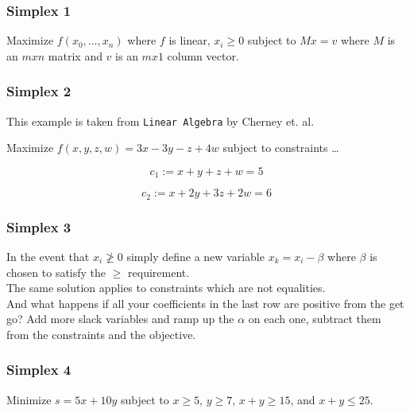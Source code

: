 \documentclass{beamer}
\begin{document}
\begin{frame}
\frametitle{Simplex 1}

    Maximize $f(x_{0},\ldots,x_{n})$ where $f$ is linear, $x_{i}\geq0$ subject
    to $Mx=v$ where $M$ is an $mxn$ matrix and $v$ is an $mx1$ column vector.

\end{frame}

\begin{frame}
\frametitle{Simplex 2}

    This example is taken from \texttt{Linear Algebra} by Cherney et. al.

    \hspace{2cm}

    Maximize $f(x,y,z,w) = 3x - 3y - z + 4w$ subject to constraints \ldots

    \hspace{2cm}

    \begin{equation}
    \label{c1}
        c_{1} := x + y + z + w = 5
    \end{equation}

    \begin{equation}
    \label{c2}
        c_{2} := x + 2y + 3z + 2w = 6 
    \end{equation}

\end{frame}
    
\begin{frame}
\frametitle{Simplex 3}

    In the event that $x_{i} \ngeq 0$ simply define a new variable $x_{k} = x_{i} - \beta$ where $\beta$ is chosen to satisfy the $\geq$ requirement.\\
    The same solution applies to constraints which are not equalities.\\
    And what happens if all your coefficients in the last row are positive from
    the get go? Add more slack variables and ramp up the $\alpha$ on each one,
    subtract them from the constraints and the objective.

\end{frame}

\begin{frame}
\frametitle{Simplex 4}

    Minimize $s = 5x + 10y$ subject to $x \geq 5$, $y \geq 7$, $x + y \geq 15$,
    and $x + y \leq 25$.

\end{frame}
\end{document}
